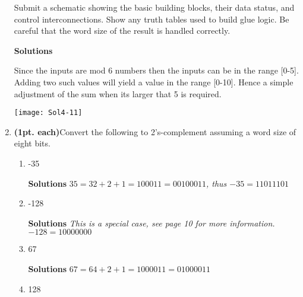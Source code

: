 \begin{enumerate}
            Submit a schematic showing the basic building blocks, their
            data status, and control interconnections.  Show any truth
            tables used to build glue logic.  Be careful that the word
            size of the result is handled correctly.

            \begin{onlysolution} \textbf{Solutions} \itshape{
                    Since the inputs are mod 6 numbers then the inputs can be in the
                    range [0-5].  Adding two such values will yield a value in the
                    range [0-10].  Hence a simple adjustment of the sum when its larger
                    that 5 is required.

                    \texttt{[image: Sol4-11]}

                }
            \end{onlysolution}

        \item \textbf{ (1pt. each)}Convert the following to 2's-complement
            assuming a word size of eight bits.
            \begin{enumerate}
                \item -35

                    \begin{onlysolution} \textbf{Solutions} \itshape{
                            $35 = 32+2+1 = 100011 = 00100011$, thus $-35=11011101$
                        }
                    \end{onlysolution}

                \item  -128

                    \begin{onlysolution} \textbf{Solutions} \itshape{
                            This is a special case, see page 10 for more information.
                            $-128 = 10000000$
                        }
                    \end{onlysolution}

                \item  67

                    \begin{onlysolution} \textbf{Solutions} \itshape{
                            $67=64+2+1 = 100 0011 = 0100 0011$
                        }
                    \end{onlysolution}

                \item  128


\end{enumerate}
\end{enumerate}
